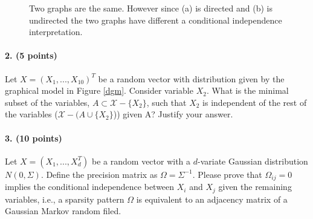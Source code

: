 \documentclass[11pt]{article}
\begin{document}
\begin{figure}[h]
{
\label{ugm}
}
\caption{Two graphs are the same. However since (a) is directed and (b) is undirected the two graphs have different a conditional independence interpretation.}
\end{figure}

\paragraph{2. (5 points)} Let $X = (X_1, . . . , X_{10})^T$ be a random vector with distribution given by the graphical model in Figure \ref{dgm}. Consider variable $X_2$. What is the minimal subset of the variables, $A\subset \mathcal{X} -\{X_2\}$, such that $X_2$ is independent of the rest of the variables ($\mathcal{X} - (A\cup{\{ X_2\}}$)) given A? Justify your answer.

\paragraph{3. (10 points)} Let $X = (X_1, . . . , X_{d}^T)$ be a random vector with a $d$-variate Gaussian distribution $N(0,\Sigma)$. Define the precision matrix as $\Omega = \Sigma^{-1}$. Please prove that $\Omega_{ij}=0$ implies the conditional independence between $X_i$ and $X_j$ given the remaining variables, i.e., a sparsity pattern $\Omega$ is equivalent to an adjacency matrix of a Gaussian Markov random filed.
\end{document}
